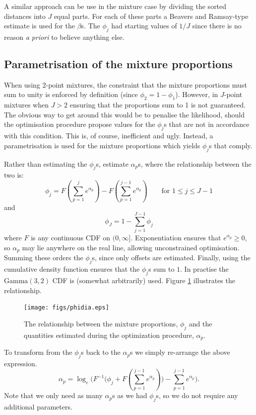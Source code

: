 \documentclass[useAMS,referee]{biom}
\begin{document}
A similar approach can be use in the mixture case by dividing the sorted distances into $J$ equal parts. For each of these parts a Beavers and Ramsay-type estimate is used for the $\beta$s. The $\phi_j$ had starting values of $1/J$ since there is no reason \textit{a priori} to believe anything else.

\subsection*{Parametrisation of the mixture proportions}

When using 2-point mixtures, the constraint that the mixture proportions must sum to unity is enforced by definition (since $\phi_2=1-\phi_1$). However, in $J$-point mixtures when $J>2$ ensuring that the proportions sum to 1 is not guaranteed. The obvious way to get around this would be to penalise the likelihood, should the optimisation procedure propose values for the $\phi_j$s that are not in accordance with this condition. This is, of course, inefficient and ugly. Instead, a parametrisation is used for the mixture proportions which yields $\phi_j$s that comply.

Rather than estimating the $\phi_j$s, estimate $\alpha_p$s, where the relationship between the two is:
\begin{equation*}
\phi_j = F(\sum_{p=1}^j e^{\alpha_p}) - F(\sum_{p=1}^{j-1} e^{\alpha_p}) \qquad \text{for } 1\leq j \leq J-1
\end{equation*}
and
\begin{equation*}
\phi_J = 1-\sum_{j=1}^{J-1} \phi_j
\end{equation*}
where $F$ is any continuous CDF on $(0,\infty]$. Exponentiation ensures that $e^{\alpha_p}\geq0$, so $\alpha_p$ may lie anywhere on the real line, allowing unconstrained optimisation. Summing these orders the $\phi_j$s, since only offsets are estimated. Finally, using the cumulative density function ensures that the $\phi_j$s sum to $1$. In practise the $\text{Gamma}(3,2)$ CDF is (somewhat arbitrarily) used. Figure \ref{mmds-phifig} illustrates the relationship.

\begin{figure}
\centering
\texttt{[image: figs/phidia.eps]}
\caption{The relationship between the mixture proportions, $\phi_j$ and the quantities estimated during the optimization procedure, $\alpha_p$.}
\label{mmds-phifig}
\end{figure}

To transform from the $\phi_j$s back to the $\alpha_p$s we simply re-arrange the above expression.
\begin{equation*}
\alpha_p = \log_e \Big(F^{-1}\Big(\phi_j + F(\sum_{p=1}^{j-1} e^{\alpha_p})\Big) - \sum_{p=1}^{j-1} e^{\alpha_p}\Big).
\end{equation*}
Note that we only need as many $\alpha_p$s as we had $\phi_j$s, so we do not require any additional parameters.
\end{document}
